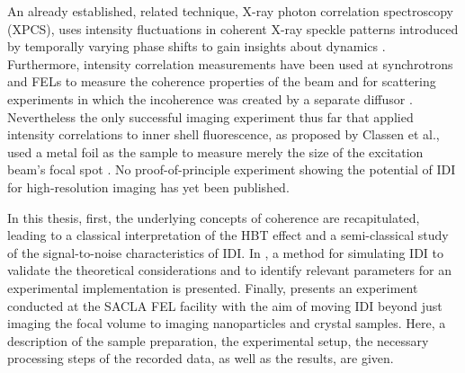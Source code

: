 An already established, related technique, X-ray photon correlation spectroscopy (XPCS), uses intensity fluctuations in coherent X-ray speckle patterns introduced by temporally varying phase shifts to gain insights about dynamics \cite{lehmkuhler2021,grubel2007}. Furthermore, intensity correlation measurements have been used at synchrotrons and FELs to measure the coherence properties of the beam and for scattering experiments in which the incoherence was created by a separate diffusor \cite{yabashi2002,singer2013,inoue2019,gorobtsov2018,schneider2018}.  Nevertheless the only successful imaging experiment thus far that applied intensity correlations to inner shell fluorescence, as proposed by Classen et al., used a metal foil as the sample to measure merely the size of the excitation beam's focal spot \cite{nakumura2020}. No proof-of-principle experiment showing the potential of IDI for high-resolution imaging has yet been published. 

In this thesis, first, the underlying concepts of coherence are recapitulated, leading to a classical interpretation of the HBT effect and a semi-classical study of the signal-to-noise characteristics of IDI. In , a method for simulating IDI to validate the theoretical considerations and to identify relevant parameters for an experimental implementation is presented.  Finally,  presents an experiment conducted at the SACLA FEL facility with the aim of moving IDI beyond just imaging the focal volume to imaging nanoparticles and crystal samples. Here, a description of the sample preparation, the experimental setup, the necessary processing steps of the recorded data, as well as the results, are given.

